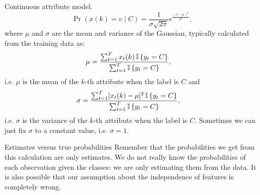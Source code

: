 \begin{frame}
  \begin{block}{Continuous attribute model.}
    \[
    \Pr(x(k) = v \mid C) = \frac{1}{\sigma \sqrt{2 \pi}} e^{\frac{(v -
        \mu)^2}{\sigma^2}},
    \]
    where $\mu$ and $\sigma$ are the mean and variance of the
    Gaussian, typically calculated from the training data as:
    \begin{align*}
      \mu &=   \frac{\sum_{t=1}^T x_t(k) \mathop{\mbox{\ensuremath{\mathbb{I}}}}\left\{y_t = C\right\}}
            {\sum_{t=1}^T \mathop{\mbox{\ensuremath{\mathbb{I}}}}\left\{y_t = C\right\}},
    \end{align*}
    i.e. $\mu$ is the mean of the $k$-th attribute when the label is
    $C$ and
    \begin{align*}
      \sigma &=   \frac{\sum_{t=1}^T [x_t(k) - \mu]^2 \mathop{\mbox{\ensuremath{\mathbb{I}}}}\left\{y_t = C\right\}}
               {\sum_{t=1}^T \mathop{\mbox{\ensuremath{\mathbb{I}}}}\left\{y_t = C\right\}},
    \end{align*}
    i.e. $\sigma$ is the variance of the $k$-th attribute when the
    label is $C$.  Sometimes we can just fix $\sigma$ to a constant
    value, i.e. $\sigma = 1$.
  \end{block}
\end{frame}

\begin{frame}
  \begin{alertblock}{Estimates versus true probabilities}
    Remember that the probabilities we get from this calculation are
    only \alert{estimates}. We do not really know the probabilities of
    each observation given the classes: we are only estimating them
    from the data. It is also possible that our assumption about the
    independence of features is completely wrong.
  \end{alertblock}
\end{frame}

